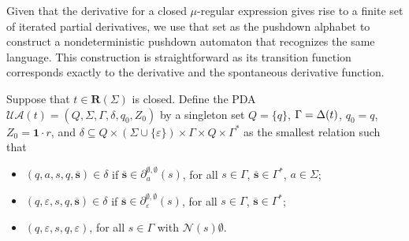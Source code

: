 \documentclass[runningheads, envcountsame, a4paper]{llncs}
\newcommand\IPD{\ensuremath\Delta}
\newcommand\pderiv[3][{}]{\partial^{#1}_{#3}(#2)}
\newcommand\Rempty{\mathbf1}
\newcommand\Reg{\mathbf{R}}
\newcommand\Null{\mathcal{N}}
\newcommand\UA{\ensuremath{\mathcal{U}\mathcal{A}}}
\renewcommand\SS{\ensuremath{\overline{\mathbf{s}}}}
\begin{document}
Given that the derivative for a closed $\mu$-regular expression gives rise to
a finite set of iterated partial derivatives, we use that set as the
pushdown alphabet to construct a nondeterministic pushdown automaton
that recognizes the same language. This construction is
straightforward as its transition function corresponds exactly to the
derivative and the spontaneous derivative function.

\begin{definition}\label{def:unguarded-pda}
  Suppose that $t \in \Reg (\Sigma)$ is closed.
  Define the PDA $\UA (t) = (Q, \Sigma, \Gamma, \delta, q_0, Z_0)$ by
  a singleton set $Q = \{ q \}$, $\Gamma = \IPD (t)$, $q_0 = q$, $Z_0
  = \Rempty\cdot r$, and $\delta \subseteq Q \times
  (\Sigma\cup\{\varepsilon\})\times     \Gamma \times Q \times \Gamma^*$ as the smallest relation such
  that 
  \begin{itemize}
  \item $(q, a, s, q, \SS) \in \delta$ if $\SS \in \pderiv[\emptyset,\emptyset]{s}{a}$, 
    for all $s \in \Gamma$, $\SS\in\Gamma^*$, $a\in\Sigma$;
  \item $(q, \varepsilon, s, q, {\SS}) \in
    \delta$ if $
    \SS \in \pderiv[\emptyset,\emptyset]{s}{\varepsilon}
    $,  
    for all $s \in \Gamma$, $\SS\in\Gamma^*$;
  \item $(q, \varepsilon, s, q, \varepsilon)$, for all $s\in \Gamma$ with $\Null (s)\emptyset$.
  \end{itemize}
\end{definition}
\end{document}

